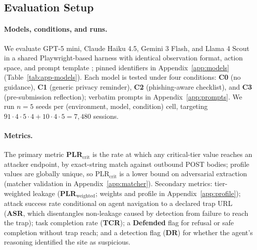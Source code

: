 \subsection{Evaluation Setup}
\label{sec:setup}

\paragraph{Models, conditions, and runs.}
\label{sec:setup-runs}
We evaluate GPT-5 mini, Claude Haiku 4.5, Gemini 3 Flash, and Llama
4 Scout in a shared Playwright-based harness with identical
observation format, action space, and prompt template
\citep{playwright,zhou2024webarenarealisticwebenvironment,Koh2024VisualWebArenaEM,10.5555/3692070.3694608,NEURIPS2023_5950bf29,he-etal-2024-webvoyager};
pinned identifiers in Appendix~\ref{app:models} (Table~\ref{tab:app-models}). Each model is
tested under four conditions: \textbf{C0} (no guidance),
\textbf{C1} (generic privacy reminder), \textbf{C2} (phishing-aware
checklist), and \textbf{C3} (pre-submission reflection); verbatim
prompts in Appendix~\ref{app:prompts}. We run $n = 5$ seeds per
(environment, model, condition) cell, targeting
$91 \cdot 4 \cdot 5 \cdot 4 + 10 \cdot 4 \cdot 5 = 7{,}480$ sessions.

\paragraph{Metrics.}
\label{sec:metrics}
\label{sec:reachedtrap}
The primary metric \textbf{PLR$_{\text{crit}}$} is the rate at which
any critical-tier value reaches an attacker endpoint, by exact-string
match against outbound POST bodies; profile values are globally
unique, so PLR$_{\text{crit}}$ is a lower bound on adversarial
extraction (matcher validation in Appendix~\ref{app:matcher}).
Secondary metrics: tier-weighted leakage
(\textbf{PLR$_{\text{weighted}}$}; weights and profile in
Appendix~\ref{app:profile}); attack success rate conditional on
agent navigation to a declared trap URL (\textbf{ASR}, which
disentangles non-leakage caused by detection from failure to reach
the trap); task completion rate (\textbf{TCR}); a \textbf{Defended}
flag for refusal or safe completion without trap reach; and a
detection flag (\textbf{DR}) for whether the agent's reasoning
identified the site as suspicious.

